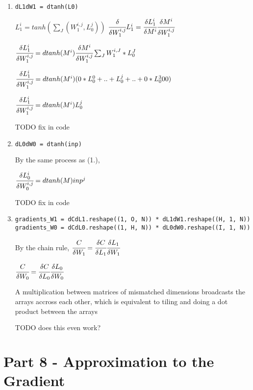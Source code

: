 \documentclass[]{article}
\begin{document}
\begin{enumerate}
	\def\labelenumi{\arabic{enumi}.}
	\item
	      \begin{verbatim}
dL1dW1 = dtanh(L0)
	\end{verbatim}
	
	\(L_1^i = tanh(\sum_J(W_1^{i,j}, L_0^j))\)
	\(\cfrac{\delta}{\delta W_1^{i,j}} L_1^i =  \cfrac{\delta L_1^i}{\delta M^i}  \cfrac{\delta M^i}{\delta W_1^{i,j}}\)
	
	\(\cfrac{\delta L_1^i }{\delta W_1^{i,j}}=  dtanh(M^i)  \cfrac{\delta M^i}{\delta W_1^{i,j}}  \sum_J W_1^{i,J} * L_0^J\)
	
	\(\cfrac{\delta L_1^i }{\delta W_1^{i,j}}=  dtanh(M^i)  (0 * L_0^0 + .. +L_0^j + .. + 0 * L_0^300)\)
	
	\(\cfrac{\delta L_1^i}{\delta W_1^{i,j}} =  dtanh(M^i) L_0^j\)
	
	TODO fix in code
	\item
	      \begin{verbatim}
dL0dW0 = dtanh(inp)
	\end{verbatim}
	
	By the same process as (1.),
	
	\(\cfrac{\delta L_0^i}{\delta W_0^{i,j}} =  dtanh(M) inp^j\)
	
	TODO fix in code
	\item
	      \begin{verbatim}
gradients_W1 = dCdL1.reshape((1, O, N)) * dL1dW1.reshape((H, 1, N))
gradients_W0 = dCdL0.reshape((1, H, N)) * dL0dW0.reshape((I, 1, N))
	\end{verbatim}
	
	By the chain rule,
	\(\cfrac{C}{\delta W_1} = \cfrac{\delta C}{\delta L_1} \cfrac{\delta L_1}{\delta W_1}\)
	
	\(\cfrac{C}{\delta W_0} = \cfrac{\delta C}{\delta L_0} \cfrac{\delta L_0}{\delta W_0}\)
	
	A multiplication between matrices of mismatched dimensions broadcasts
	the arrays accross each other, which is equivalent to tiling and doing
	a dot product between the arrays
	
	TODO does this even work?
\end{enumerate}

\clearpage

\section{Part 8 - Approximation to the
 Gradient}\label{part-8---approximation-to-the-gradient}
\end{document}
